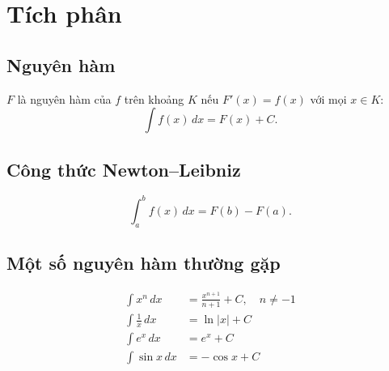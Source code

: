 \section{Tích phân}

\subsection{Nguyên hàm}
$F$ là nguyên hàm của $f$ trên khoảng $K$ nếu $F'(x) = f(x)$ với mọi $x \in K$:
\[
\int f(x)\,dx = F(x) + C.
\]

\subsection{Công thức Newton--Leibniz}
\[
\int_a^b f(x)\,dx = F(b) - F(a).
\]

\subsection{Một số nguyên hàm thường gặp}
\begin{align*}
\int x^n\,dx &= \frac{x^{n+1}}{n+1} + C, \quad n \neq -1 \\
\int \frac{1}{x}\,dx &= \ln|x| + C \\
\int e^x\,dx &= e^x + C \\
\int \sin x\,dx &= -\cos x + C
\end{align*}
